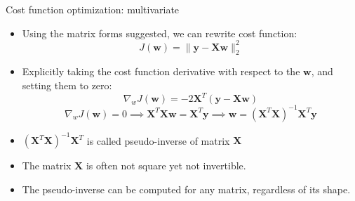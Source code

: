 \documentclass[serif, aspectratio=169]{beamer}
\begin{document}
    \begin{frame}{Cost function optimization: multivariate}

        \begin{itemize}
            \item Using the matrix forms suggested, we can rewrite cost function:
            \[
                J(\mathbf{w}) = \| \mathbf{y} - \mathbf{Xw} \|_2^2
            \]
            \item Explicitly taking the cost function derivative with respect to the \( \mathbf{w} \), and setting them to zero:
            \[
                \nabla_w J(\mathbf{w}) = -2 \mathbf{X}^T \left( \mathbf{y} - \mathbf{Xw} \right)
            \]
            \[
                \nabla_w J(\mathbf{w}) = 0 \implies \mathbf{X}^T \mathbf{Xw} = \mathbf{X}^T \mathbf{y} \implies \mathbf{w} = \left( \mathbf{X}^T \mathbf{X} \right)^{-1} \mathbf{X}^T \mathbf{y}
            \]
        \end{itemize}


        \begin{itemize}
            \item \( \left(\mathbf{X}^T \mathbf{X} \right)^{-1} \mathbf{X}^T \) is called pseudo-inverse of matrix \( \mathbf{X} \)
            \item The matrix \( \mathbf{X} \) is often not square yet not invertible. \item The pseudo-inverse can be computed for any matrix, regardless of its shape.
        \end{itemize}
    \end{frame}
\end{document}
